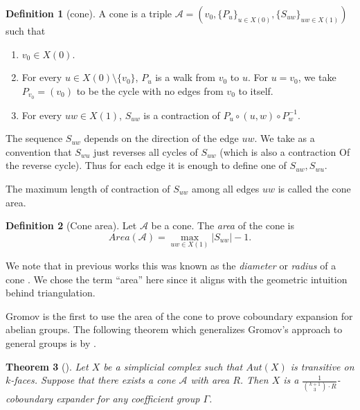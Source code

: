 \documentclass[10pt,a4paper]{article}
\newtheorem{theorem}{Theorem}[section]
\theoremstyle{definition}
\newtheorem{definition}[theorem]{Definition}
\theoremstyle{remark}
\newcommand{\abs}[1]{\lvert#1\rvert}
\newcommand{\set}[1]{\{#1\}}
\def\cont{f}
\numberwithin{equation}{section}
\def\cont{S}
\begin{document}
\begin{definition}[cone]
    A cone is a triple \(\mathcal{A}=(v_0,\set{P_u}_{u \in X(0)}, \set{\cont_{uw}}_{uw \in X(1)})\) such that
\begin{enumerate}
    \item \(v_0 \in X(0)\).
    \item For every \( u \in X(0)\setminus\set{v_0}\), \(P_{u}\) is a walk from \(v_0\) to \(u\). For \(u = v_0\), we take \(P_{v_0} = (v_0)\) to be the cycle with no edges from \(v_0\) to itself.
    \item For every \(uw \in X(1)\), \(\cont_{uw}\) is a contraction of \(P_{u} \circ (u,w) \circ P_w^{-1}\).
\end{enumerate}
\end{definition}
The sequence \(\cont_{uw}\) depends on the direction of the edge \(uw\). We take as a convention that \(\cont_{wu}\) just reverses all cycles of \(\cont_{uw}\) (which is also a contraction Of the reverse cycle). Thus for each edge it is enough to define one of \(\cont_{uw},\cont_{wu}\). 

The maximum length of contraction of \(S_{uw}\) among all edges \(uw\) is called the cone area.
\begin{definition}[Cone area]
    Let \(\mathcal{A}\) be a cone. The \emph{area} of the cone is
        \[Area(\mathcal{A}) = \max_{uw \in X(1)} \abs{\cont_{uw}}-1.\]
\end{definition}

We note that in previous works this was known as the \emph{diameter} or \emph{radius} of a cone \cite{KaufmanO2021,DiksteinD2023swap}. We chose the term ``area'' here since it aligns with the geometric intuition behind triangulation.

Gromov is the first to use  the area of the cone to prove coboundary expansion for abelian groups. 
The following theorem which generalizes Gromov's approach to general groups is by \cite{DiksteinD2023swap}.
\begin{theorem}[{\cite[Lemma 1.6]{DiksteinD2023swap}}] \label{thm:group-and-cones}
    Let \(X\) be a simplicial complex such that \(Aut(X)\) is transitive on \(k\)-faces. Suppose that there exists a cone \(\mathcal{A}\) with area \(R\). Then \(X\) is a \(\frac{1}{\binom{k+1}{3}\cdot R}\)-coboundary expander for any coefficient group \(\Gamma\).
\end{theorem}
\end{document}
